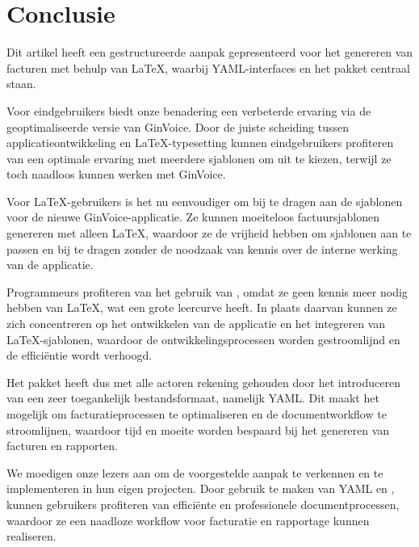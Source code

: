 \section{Conclusie}\label{sec:conclusie}
Dit artikel heeft een gestructureerde aanpak gepresenteerd voor het genereren van facturen met behulp van \LaTeX, waarbij YAML-interfaces en het  pakket centraal staan.

Voor eindgebruikers biedt onze benadering een verbeterde ervaring via de geoptimaliseerde versie van GinVoice.
Door de juiste scheiding tussen applicatieontwikkeling en \LaTeX-typesetting kunnen eindgebruikers profiteren van een optimale ervaring met meerdere sjablonen om uit te kiezen, terwijl ze toch naadloos kunnen werken met GinVoice.

Voor \LaTeX-gebruikers is het nu eenvoudiger om bij te dragen aan de sjablonen voor de nieuwe GinVoice-applicatie.
Ze kunnen moeiteloos factuursjablonen genereren met alleen \LaTeX, waardoor ze de vrijheid hebben om sjablonen aan te passen en bij te dragen zonder de noodzaak van kennis over de interne werking van de applicatie.

Programmeurs profiteren van het gebruik van , omdat ze geen kennis meer nodig hebben van \LaTeX, wat een grote leercurve heeft.
In plaats daarvan kunnen ze zich concentreren op het ontwikkelen van de applicatie en het integreren van \LaTeX-sjablonen, waardoor de ontwikkelingsprocessen worden gestroomlijnd en de efficiëntie wordt verhoogd.

Het pakket  heeft dus met alle actoren rekening gehouden door het introduceren van een zeer toegankelijk bestandsformaat, namelijk YAML\@.
Dit maakt het mogelijk om facturatieprocessen te optimaliseren en de documentworkflow te stroomlijnen, waardoor tijd en moeite worden bespaard bij het genereren van facturen en rapporten.

We moedigen onze lezers aan om de voorgestelde aanpak te verkennen en te implementeren in hun eigen projecten.
Door gebruik te maken van YAML en , kunnen gebruikers profiteren van efficiënte en professionele documentprocessen, waardoor ze een naadloze workflow voor facturatie en rapportage kunnen realiseren.
